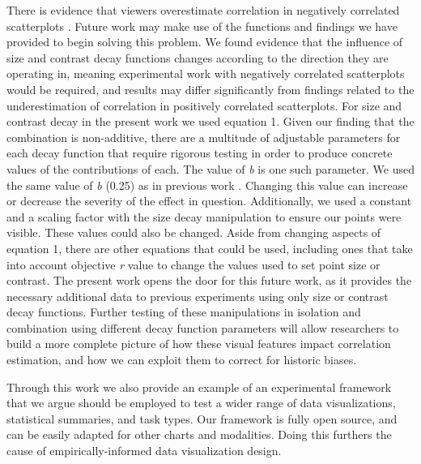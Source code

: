 \documentclass[manuscript, review, anonymous, screen]{acmart}
\begin{document}
There is evidence that viewers overestimate correlation in negatively
correlated scatterplots \citep{sher_2017}. Future work may make use of
the functions and findings we have provided to begin solving this
problem. We found evidence that the influence of size and contrast decay
functions changes according to the direction they are operating in,
meaning experimental work with negatively correlated scatterplots would
be required, and results may differ significantly from findings related
to the underestimation of correlation in positively correlated
scatterplots. For size and contrast decay in the present work we used
equation 1. Given our finding that the combination is non-additive,
there are a multitude of adjustable parameters for each decay function
that require rigorous testing in order to produce concrete values of the
contributions of each. The value of \emph{b} is one such parameter. We
used the same value of \emph{b} (0.25) as in previous work
\citep{strain_2023, strain_2023b}. Changing this value can increase or
decrease the severity of the effect in question. Additionally, we used a
constant and a scaling factor with the size decay manipulation to ensure
our points were visible. These values could also be changed. Aside from
changing aspects of equation 1, there are other equations that could be
used, including ones that take into account objective \emph{r} value to
change the values used to set point size or contrast. The present work
opens the door for this future work, as it provides the necessary
additional data to previous experiments using only size
\citep{strain_2023b} or contrast \citep{strain_2023} decay functions.
Further testing of these manipulations in isolation and combination
using different decay function parameters will allow researchers to
build a more complete picture of how these visual features impact
correlation estimation, and how we can exploit them to correct for historic biases.

Through this work we also provide an example of an experimental
framework that we argue should be employed to test a wider range of data
visualizations, statistical summaries, and task types. Our framework is
fully open source, and can be easily adapted for other charts and
modalities. Doing this furthers the cause of empirically-informed data
visualization design.




\end{document}
